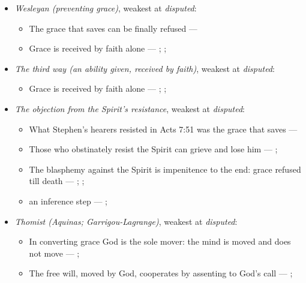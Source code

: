 \documentclass[11pt]{article}
\begin{document}
\begin{itemize}
\begin{itemize}
\end{itemize}
\item \emph{Wesleyan (preventing grace)}, weakest at \emph{disputed}:
\begin{itemize}
\item The grace that saves can be finally refused --- \cite[397]{wesley-works-9-1827}
\item Grace is received by faith alone --- \cite[Augsburg Confession IV.1–3]{concordia-triglotta-1921}; \cite[Sermon 1, III.1]{wesley-sermons-1872}; \cite[Trent, Session VI (1547), canon 9]{tanner-decrees-1990}
\end{itemize}
\item \emph{The third way (an ability given, received by faith)}, weakest at \emph{disputed}:
\begin{itemize}
\item Grace is received by faith alone --- \cite[Augsburg Confession IV.1–3]{concordia-triglotta-1921}; \cite[Sermon 1, III.1]{wesley-sermons-1872}; \cite[Trent, Session VI (1547), canon 9]{tanner-decrees-1990}
\end{itemize}
\item \emph{The objection from the Spirit’s resistance}, weakest at \emph{disputed}:
\begin{itemize}
\item What Stephen’s hearers resisted in Acts 7:51 was the grace that saves --- \cite[Five Arminian Articles (1610), art. 4]{schaff-creeds-christendom-3-1977}
\item Those who obstinately resist the Spirit can grieve and lose him --- \cite[Solid Declaration II.83]{concordia-triglotta-1921}; \cite[Solid Declaration XI.42]{concordia-triglotta-1921}
\item The blasphemy against the Spirit is impenitence to the end: grace refused till death --- \cite[325]{npnf1-06-1888}; \cite[II-II q.14 a.1]{aquinas-summa-1920}; \cite[74]{calvin-harmony-evangelists-2-1845}
\item an inference step --- \cite[325]{npnf1-06-1888}; \cite[On Rebuke and Grace, ch. 43]{npnf1-05-1887}
\end{itemize}
\item \emph{Thomist (Aquinas; Garrigou-Lagrange)}, weakest at \emph{disputed}:
\begin{itemize}
\item In converting grace God is the sole mover: the mind is moved and does not move --- \cite[I-II q.111 a.2]{aquinas-summa-1920}; \cite[ch. IV]{garrigou-lagrange-grace-1952}
\item The free will, moved by God, cooperates by assenting to God’s call --- \cite[Trent, Session VI (1547), canon 4]{tanner-decrees-1990}; \cite[45]{waterworth-trent-1848}

\end{itemize}
\end{itemize}
\end{document}

